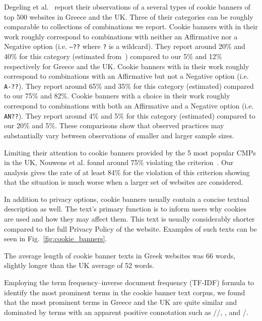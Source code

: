 Degeling et al.~\cite{degeling2018we} report their observations of a several types of cookie banners of top 500 websites in Greece and the UK. Three of their categories can be roughly comparable to collections of combinations we report. 
Cookie banners with  in their work roughly correspond to combinations with neither an Affirmative nor a Negative option (i.e. \texttt{--??} where \texttt{?} is a wildcard). They report around 20\% and 40\% for this category (estimated from~\cite[Figure~5(a)]{degeling2018we}) compared to our 5\% and 12\% respectively for Greece and the UK. 
Cookie banners with  in their work roughly correspond to combinations with an Affirmative but not a Negative option (i.e. \texttt{A-??}). They report around 65\% and 35\% for this category (estimated) compared to our 75\% and 82\%. 
Cookie banners with a  choice in their work roughly correspond to combinations with both an Affirmative and a Negative option (i.e. \texttt{AN??}). They report around 4\% and 5\% for this category (estimated) compared to our 20\% and 5\%. 
These comparisons show that observed practices may substantially vary between observations of smaller and larger sample sizes. 

Limiting their attention to cookie banners provided by the 5 most popular CMPs in the UK, Nouwens et al. found around 75\% violating the  criterion~\cite{nouwens2020dark}. 
Our analysis gives the rate of at least 84\% for the violation of this criterion showing that the situation is much worse when a larger set of websites are considered. 

In addition to privacy options, cookie banners usually contain a concise textual description as well. The text's primary function is to inform users why cookies are used and how they may affect them. This text is usually considerably shorter compared to the full Privacy Policy of the website. 
Examples of such texts can be seen in Fig.~\ref{fig:cookie_banners}.

The average length of cookie banner texts in Greek websites was 66 words, slightly longer than the UK average of 52 words. 

Employing the term frequency--inverse document frequency (TF-IDF) formula to identify the most prominent terms in the cookie banner text corpus, we found that the most prominent terms in Greece and the UK are quite similar and dominated by terms with an apparent positive connotation such as //\say{$\kappa \alpha \lambda \acute{\upsilon} \tau \varepsilon \rho \eta$}, , and /\say{$\varepsilon \mu \pi \varepsilon \iota \rho \acute{\iota} \alpha$}. 

